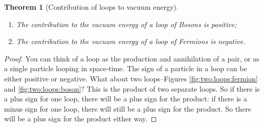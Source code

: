 \documentclass[]{article}
\newtheorem{thm}{Theorem}
\begin{document}
\begin{thm}[Contribution of loops to vacuum energy]\label{thm:contribution:loops}
	
	\begin{enumerate}
		\item The contribution to the vacuum energy of a loop of Bosons is positive;
		\item The contribution to the vacuum energy of a loop of Fermions is negative.
	\end{enumerate}
\end{thm}

\begin{proof}
	You can think of a loop as the production and annihilation of a pair, or as a single particle looping in space-time. The sign of a particle in a loop can be either positive or negative. What about two loops--Figures \ref{fig:two:loops:fermion} and \ref{fig:two:loops:boson}? This is the product of two separate loops. So if there is a plus sign for one loop, there will be a plus sign for the product: if there is a minus sign for one loop, there will still be a plus sign for the product. So there will  be a plus sign for the product either way.
	

\end{proof}
\end{document}
